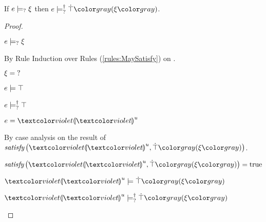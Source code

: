 \begin{lem}
  \label{lem:maysat-satormay-truify}
  If $e \models_{?} \xi$ then $\csatisfyormay{e}{\ctruify{\xi}}$.
\end{lem}
\begin{proof}
  \begin{pfsteps*}
  \item $e \models_{?} \xi$  
  \end{pfsteps*}
  By Rule Induction over Rules (\ref{rules:MaySatisfy}) on .
  \begin{byCases}

  \item[\text{(\ref{rule:CMSUnknown})}]
      \begin{pfsteps*}
      \item $\xi = \mathtt{?}$ 
      \item $e \models \top$  
      \item $e \models_{?}^{\dag} \top$  
      \end{pfsteps*}
      
  \item[\text{(\ref{rule:CMSExpEHole})}]
    \begin{pfsteps*}
    \item $e = \hehole{u}$  
    \end{pfsteps*}

    By case analysis on the result of $\fsatisfy{\hehole{u}}{\ctruify{\xi}}$.
    \begin{byCases}

    \item[\true]
      \begin{pfsteps*}
      \item $\fsatisfy{\hehole{u}}{\ctruify{\xi}}=\true$  
      \item $\csatisfy{\hehole{u}}{\ctruify{\xi}}$  
      \item $\csatisfyormay{\hehole{u}}{\ctruify{\xi}}$ 
      \end{pfsteps*}


\end{byCases}
\end{byCases}
\end{proof}
